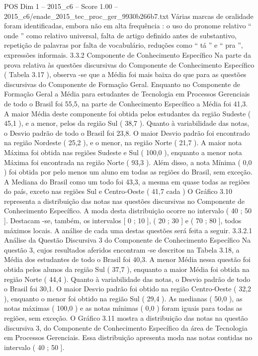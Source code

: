 \begin{textsample}{POS Dim 1 – 2015\_c6 – Score 1.00 – 2015\_c6/enade\_2015\_tec\_proc\_ger\_9930b266b7.txt}
Várias marcas de oralidade foram identificadas, embora não em alta frequência : o uso do pronome relativo “ onde ” como relativo universal, falta de artigo definido antes de substantivo, repetição de palavras por falta de vocabulário, reduções como “ tá ” e “ pra ”, expressões informais. 3.3.2 Componente de Conhecimento Específico Na parte da prova relativa às questões discursivas do Componente de Conhecimento Específico ( Tabela 3.17 ), observa -se que a Média foi mais baixa do que para as questões discursivas do Componente de Formação Geral.
Enquanto no Componente de Formação Geral a Média para estudantes de Tecnologia em Processos Gerenciais de todo o Brasil foi 55,5, na parte de Conhecimento Específico a Média foi 41,3.
A maior Média deste componente foi obtida pelos estudantes da região Sudeste ( 45,1 ), e a menor, pelos da região Sul ( 38,7 ).
Quanto à variabilidade das notas, o Desvio padrão de todo o Brasil foi 23,8.
O maior Desvio padrão foi encontrado na região Nordeste ( 25,2 ), e o menor, na região Norte ( 21,7 ).
A maior nota Máxima foi obtida nas regiões Sudeste e Sul ( 100,0 ), enquanto a menor nota Máxima foi encontrada na região Norte ( 93,3 ).
Além disso, a nota Mínima ( 0,0 ) foi obtida por pelo menos um aluno em todas as regiões do Brasil, sem exceção.
A Mediana do Brasil como um todo foi 43,3, a mesma em quase todas as regiões do país, exceto nas regiões Sul e Centro-Oeste ( 41,7 cada ) O Gráfico 3.10 representa a distribuição das notas nas questões discursivas no Componente de Conhecimento Específico.
A moda desta distribuição ocorre no intervalo ( 40 ; 50 ].
Destacam -se, também, os intervalos [ 0 ; 10 ], ( 20 ; 30 ] e ( 70 ; 80 ], todos máximos locais.
A análise de cada uma destas questões será feita a seguir. 3.3.2.1 Análise da Questão Discursiva 3 do Componente de Conhecimento Específico Na questão 3, cujos resultados aferidos encontram -se descritos na Tabela 3.18, a Média dos estudantes de todo o Brasil foi 40,3.
A menor Média nessa questão foi obtida pelos alunos da região Sul ( 37,7 ), enquanto a maior Média foi obtida na região Norte ( 44,4 ).
Quanto à variabilidade das notas, o Desvio padrão de todo o Brasil foi 30,1.
O maior Desvio padrão foi obtido na região Centro-Oeste ( 32,2 ), enquanto o menor foi obtido na região Sul ( 29,4 ).
As medianas ( 50,0 ), as notas máximas ( 100,0 ) e as notas mínimas ( 0,0 ) foram iguais para todas as regiões, sem exceção.
O Gráfico 3.11 mostra a distribuição das notas na questão discursiva 3, do Componente de Conhecimento Específico da área de Tecnologia em Processos Gerenciais.
Essa distribuição apresenta moda nas notas contidas no intervalo ( 40 ; 50 ].

\end{textsample}
